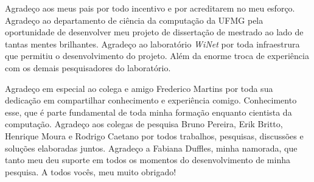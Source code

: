 Agradeço aos meus pais por todo incentivo e por acreditarem no meu esforço.
Agradeço ao departamento de ciência da computação da UFMG pela oportunidade de
desenvolver meu projeto de dissertação de mestrado ao lado de tantas mentes 
brilhantes. 
Agradeço ao laboratório \emph{WiNet} por toda infraestrura que permitiu o 
desenvolvimento do projeto. 
Além da enorme troca de experiência com os demais pesquisadores do laboratório.

Agradeço em especial ao colega e amigo Frederico Martins por toda sua dedicação
em compartilhar conhecimento e experiência comigo.
Conhecimento esse, que é parte fundamental de toda minha formação enquanto 
cientista da computação.
Agradeço aos colegas de pesquisa Bruno Pereira, Erik Britto, Henrique Moura e
Rodrigo Caetano por todos trabalhos, pesquisas, discussões e soluções 
elaboradas juntos.
Agradeço a Fabiana Duffles, minha namorada, que tanto meu deu suporte em todos
os momentos do desenvolvimento de minha pesquisa.
A todos vocês, meu muito obrigado!
